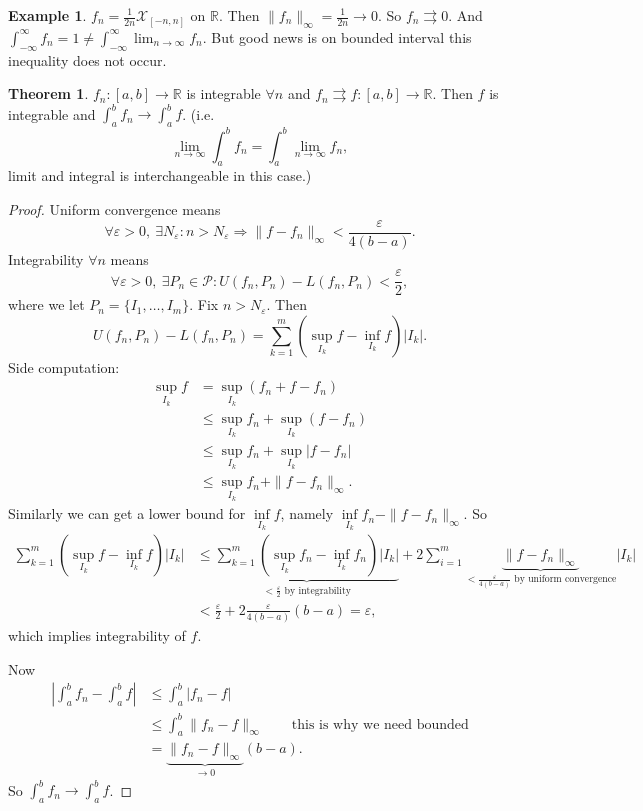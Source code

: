\documentclass[a4paper]{article}
\theoremstyle{definition}
\newtheorem{thm}[defn]{Theorem}
\newtheorem{example}[defn]{Example}
\begin{document}
\begin{example}
$f_n=\frac{1}{2n} \mathcal X_{[-n,n]}$ on $\mathbb R$. Then $\|f_n\|_\infty = \frac{1}{2n} \rightarrow 0$. So $f_n \rightrightarrows 0$. And $\int_{-\infty}^\infty f_n=1\neq \int_{-\infty}^\infty \lim_{n\rightarrow \infty} f_n$. But good news is on bounded interval this inequality does not occur.
\end{example}
\begin{thm}
\label{thm:uniconvintegrable}
$f_n:[a,b]\rightarrow \mathbb R$ is integrable $\forall n$ and $f_n \rightrightarrows f:[a,b]\rightarrow \mathbb R$. Then $f$ is integrable and $\int_a^b f_n \rightarrow \int_a^b f$. (i.e.
\[
\lim_{n\rightarrow \infty} \int_a^b f_n = \int_a^b \lim_{n\rightarrow \infty} f_n,
\]
limit and integral is interchangeable in this case.)
\end{thm}
\begin{proof}
Uniform convergence means
\[
\forall \varepsilon >0,\ \exists N_\varepsilon : n>N_\varepsilon \Rightarrow \|f-f_n\|_\infty < \frac{\varepsilon}{4(b-a)} .
\]
Integrability $\forall n$ means
\[
\forall \varepsilon >0,\ \exists P_n \in \mathcal P : U(f_n,P_n)-L(f_n,P_n)<\frac{\varepsilon}2 ,
\]
where we let $P_n=\{I_1,\ldots,I_m\}$. Fix $n>N_\varepsilon$. Then
\[
U(f_n,P_n)-L(f_n,P_n)=\sum_{k=1}^m \left(\underset{I_k}{\sup} f-\underset{I_k}{\inf} f \right) |I_k|.
\]
Side computation:
\[
\begin{aligned}
    \underset{I_k}{\sup} f &= \underset{I_k}{\sup} (f_n+f-f_n)\\&\leq \underset{I_k}{\sup} f_n+\underset{I_k}{\sup} (f-f_n)\\&\leq \underset{I_k}{\sup} f_n + \underset{I_k}{\sup} |f-f_n|\\&\leq \underset{I_k}{\sup} f_n+\|f-f_n\|_\infty .
\end{aligned}
\]
Similarly we can get a lower bound for $\underset{I_k}{\inf} f$, namely $\underset{I_k}{\inf} f_n-\|f-f_n\|_\infty .$ So
\[
\begin{aligned}\sum_{k=1}^m \left(\underset{I_k}{\sup} f-\underset{I_k}{\inf} f \right) |I_k| &\leq \underbrace{\sum_{k=1}^m \left(\underset{I_k}{\sup} f_n-\underset{I_k}{\inf} f_n \right) |I_k|}_{<\frac{\varepsilon}{2} \text{ by integrability}}+2\sum_{i=1}^m \underbrace{\|f-f_n\|_\infty}_{<\frac{\varepsilon}{4(b-a)} \text{ by uniform convergence}} |I_k| \\&< \frac{\varepsilon}{2}+2\frac{\varepsilon}{4(b-a)}(b-a)=\varepsilon ,\end{aligned}
\]
which implies integrability of $f$.

Now
\[
\begin{aligned}\left| \int_a^b f_n - \int_a^b f \right| &\leq \int_a^b |f_n-f| \\& \leq \int_a^b \|f_n-f\|_\infty \qquad \text{this is why we need bounded} \\&= \underbrace{\|f_n-f\|_\infty}_{\rightarrow 0} (b-a) .\end{aligned}
\]
So $\int_a^b f_n \rightarrow \int_a^b f$.
\end{proof}
\end{document}
